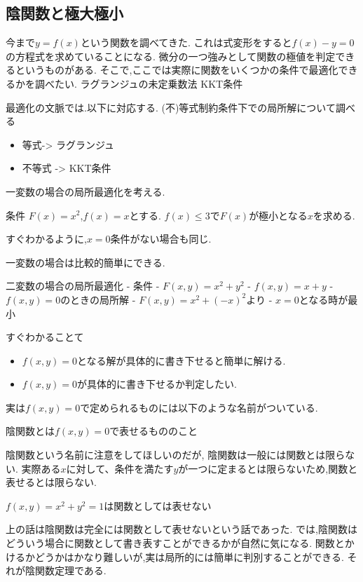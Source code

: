 \documentclass{ujarticle}
\begin{document}
\subsection{陰関数と極大極小}
今まで$y=f(x)$という関数を調べてきた.
これは式変形をすると$f(x)-y =0$の方程式を求めていることになる.
微分の一つ強みとして関数の極値を判定できるというものがある.
そこで,ここでは実際に関数をいくつかの条件で最適化できるかを調べたい.
ラグランジュの未定乗数法
KKT条件

\begin{rem}
 最適化の文脈では.以下に対応する.
 (不)等式制約条件下での局所解について調べる
\begin{itemize}
  \item 等式-> ラグランジュ
  \item 不等式 -> KKT条件
\end{itemize}
\end{rem}

一変数の場合の局所最適化を考える.
\begin{epl}
条件
$F(x) = x^2$,$f(x) = x$とする.
$f(x) \le 3$で$F(x)$が極小となる$x$を求める.

すぐわかるように,$x = 0$条件がない場合も同じ.
\end{epl}
一変数の場合は比較的簡単にできる.

二変数の場合の局所最適化
- 条件
  - $F(x, y) = x^2 + y^2$
  - $f(x, y) = x + y$
- $f(x ,y) = 0$のときの局所解
  - $F(x , y) = x^2 + (-x)^2$より
  - $x = 0$となる時が最小

すぐわかることて
\begin{itemize}
  \item $f(x, y) = 0$となる解が具体的に書き下せると簡単に解ける.
  \item  $f(x ,y) = 0$が具体的に書き下せるか判定したい.
\end{itemize}

実は$f(x,y) = 0$で定められるものには以下のような名前がついている.
\begin{dfn}
陰関数とは$f(x, y) = 0$で表せるもののこと
\end{dfn}

陰関数という名前に注意をしてほしいのだが,
陰関数は一般には関数とは限らない.
実際ある$x$に対して、条件を満たす$y$が一つに定まるとは限らないため,関数と表せるとは限らない.

\begin{epl}
$f(x , y) = x^2 + y^2 = 1$は関数としては表せない
\end{epl}

上の話は陰関数は完全には関数として表せないという話であった.
では,陰関数はどういう場合に関数として書き表すことができるかが自然に気になる.
関数とかけるかどうかはかなり難しいが,実は局所的には簡単に判別することができる.
それが陰関数定理である.
\end{document}
